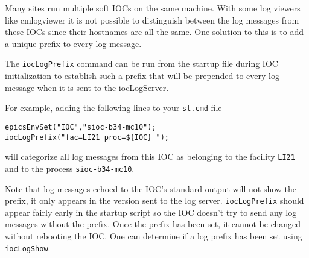 Many sites run multiple soft IOCs on the same machine.
With some log viewers like cmlogviewer it is not possible to distinguish between the log messages from these IOCs since their hostnames are all the same.
One solution to this is to add a unique prefix to every log message.

The \verb|iocLogPrefix| command can be run from the startup file during IOC initialization to establish such a prefix that will be prepended to every log message when it is sent to the iocLogServer.

For example, adding the following lines to your \verb|st.cmd| file 

\begin{verbatim}
epicsEnvSet("IOC","sioc-b34-mc10");
iocLogPrefix("fac=LI21 proc=${IOC} ");
\end{verbatim}

will categorize all log messages from this IOC as belonging to the facility \verb|LI21| and to the process \verb|sioc-b34-mc10|.

Note that log messages echoed to the IOC's standard output will not show the prefix, it only appears in the version sent to the log server.
\verb|iocLogPrefix| should appear fairly early in the startup script so the IOC doesn't try to send any log messages without the prefix.
Once the prefix has been set, it cannot be changed without rebooting the IOC.
One can determine if a log prefix has been set using \verb|iocLogShow|.
